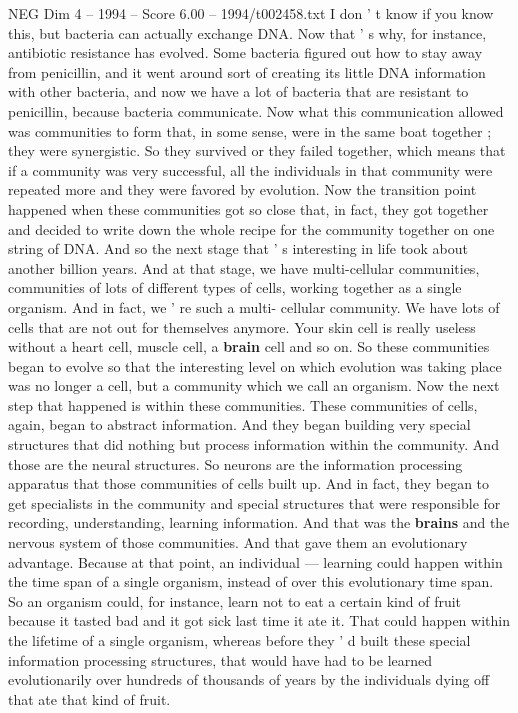 \begin{textsample}{NEG Dim 4 – 1994 – Score 6.00 – 1994/t002458.txt}
I don ' t know if you know this, but bacteria can actually exchange DNA.
Now that ' s why, for instance, antibiotic resistance has evolved.
Some bacteria figured out how to stay away from penicillin, and it went around sort of creating its little DNA information with other bacteria, and now we have a lot of bacteria that are resistant to penicillin, because bacteria communicate.
Now what this communication allowed was communities to form that, in some sense, were in the same boat together ; they were synergistic.
So they survived or they failed together, which means that if a community was very successful, all the individuals in that community were repeated more and they were favored by evolution.
Now the transition point happened when these communities got so close that, in fact, they got together and decided to write down the whole recipe for the community together on one string of DNA.
And so the next stage that ' s interesting in life took about another billion years.
And at that stage, we have multi-cellular communities, communities of lots of different types of cells, working together as a single organism.
And in fact, we ' re such a multi- cellular community.
We have lots of cells that are not out for themselves anymore.
Your skin cell is really useless without a heart cell, muscle cell, a \textbf{brain} cell and so on.
So these communities began to evolve so that the interesting level on which evolution was taking place was no longer a cell, but a community which we call an organism.
Now the next step that happened is within these communities.
These communities of cells, again, began to abstract information.
And they began building very special structures that did nothing but process information within the community.
And those are the neural structures.
So neurons are the information processing apparatus that those communities of cells built up.
And in fact, they began to get specialists in the community and special structures that were responsible for recording, understanding, learning information.
And that was the \textbf{brains} and the nervous system of those communities.
And that gave them an evolutionary advantage.
Because at that point, an individual — learning could happen within the time span of a single organism, instead of over this evolutionary time span.
So an organism could, for instance, learn not to eat a certain kind of fruit because it tasted bad and it got sick last time it ate it.
That could happen within the lifetime of a single organism, whereas before they ' d built these special information processing structures, that would have had to be learned evolutionarily over hundreds of thousands of years by the individuals dying off that ate that kind of fruit.

\end{textsample}
